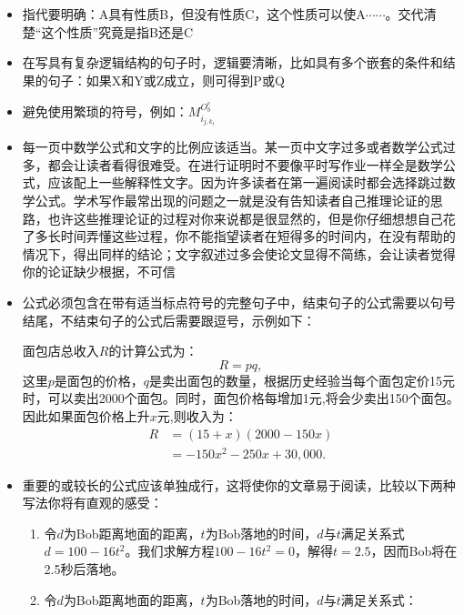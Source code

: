 \documentclass{formatBook}
\begin{document}
\begin{itemize}
    \item 指代要明确：A具有性质B，但没有性质C，这个性质可以使A$\cdots\cdots$。交代清楚“这个性质”究竟是指B还是C
    \item 在写具有复杂逻辑结构的句子时，逻辑要清晰，比如具有多个嵌套的条件和结果的句子：如果X和Y或Z成立，则可得到P或Q
    \item 避免使用繁琐的符号，例如：$M_{i_{j, k_{t}}}^{O_{b}^{c}}$
    \item 每一页中数学公式和文字的比例应该适当。某一页中文字过多或者数学公式过多，都会让读者看得很难受。在进行证明时不要像平时写作业一样全是数学公式，应该配上一些解释性文字。因为许多读者在第一遍阅读时都会选择跳过数学公式。学术写作最常出现的问题之一就是没有告知读者自己推理论证的思路，也许这些推理论证的过程对你来说都是很显然的，但是你仔细想想自己花了多长时间弄懂这些过程，你不能指望读者在短得多的时间内，在没有帮助的情况下，得出同样的结论；文字叙述过多会使论文显得不简练，会让读者觉得你的论证缺少根据，不可信
    \item 公式必须包含在带有适当标点符号的完整句子中，结束句子的公式需要以句号结尾，不结束句子的公式后需要跟逗号，示例如下：\par
          面包店总收入$R$的计算公式为：
          \begin{equation*}
              R=pq,
          \end{equation*}
          这里$p$是面包的价格，$q$是卖出面包的数量，根据历史经验当每个面包定价15元时，可以卖出2000个面包。同时，面包价格每增加1元,将会少卖出150个面包。因此如果面包价格上升$x$元,则收入为：
          \begin{equation*}
              \begin{split}
                  R&=(15+x)(2000-150x)\\
                  &=-150x^{2}-250x+30,000.
              \end{split}
          \end{equation*}
    \item 重要的或较长的公式应该单独成行，这将使你的文章易于阅读，比较以下两种写法你将有直观的感受：
          \begin{enumerate}
              \item 令$d$为Bob距离地面的距离，$t$为Bob落地的时间，$d$与$t$满足关系式$d = 100 − 16t^{2}$。我们求解方程$100 − 16t^{2} = 0$，解得$t =2.5$，因而Bob将在2.5秒后落地。
              \item 令$d$为Bob距离地面的距离，$t$为Bob落地的时间，$d$与$t$满足关系式：
                    \begin{equation*}

\end{equation*}
\end{enumerate}
\end{itemize}
\end{document}

